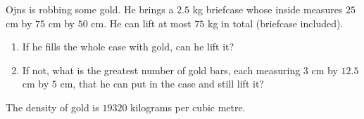Ojns is robbing some gold. He brings a $2.5$ kg briefcase whose inside measures $25$ cm by $75$ cm by $50$ cm. He can lift at most $75$ kg in total (briefcase included).
\begin{enumerate}
\item[(a)] If he fills the whole case with gold, can he lift it?
\item[(b)] If not, what is the greatest number of gold bars, each measuring $3$ cm by $12.5$ cm by $5$ cm, that he can put in the case and still lift it?
\end{enumerate}
The density of gold is $19320$ kilograms per cubic metre.
